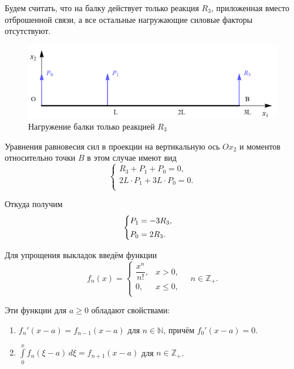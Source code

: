 \documentclass[12pt, a4paper]{article}
\begin{document}
	Будем считать, что на балку действует только реакция $R_3$, приложенная вместо отброшенной связи, а все остальные нагружающие силовые факторы отсутствуют.
	
	\begin{figure}[!h]
		\centering
		\includegraphics[width=0.75\linewidth]{plot-4}
		\caption{Нагружение балки только реакцией $R_3$}
	\end{figure}
	
	Уравнения равновесия сил в проекции на вертикальную ось $Ox_2$ и моментов относительно точки $B$ в этом случае имеют вид
	\vspace{-0.5em}
	\begin{equation*}
		\begin{cases}
			R_3 + P_1 + P_0 = 0, \\ 
			2L \cdot P_1 + 3L \cdot P_0 = 0. \\
		\end{cases}
	\end{equation*}
	
	Откуда получим
	\begin{equation}
		\begin{cases} \vspace{0.25em}
			P_1 = - 3 R_3, \\ 
			P_0 = 2 R_3. \\
		\end{cases}
		\label{eqP0P1R}
	\end{equation}
	
	Для упрощения выкладок введём функции
	\[
	f_n(x) = 
	\begin{cases}
		\dfrac{x^n}{n!}, & x > 0, \\ 
		0, & x \leq 0, \\
	\end{cases}
	\quad n \in \mathbb{Z}_+.
	\]
	
	\newpage
	
	Эти функции для $a \geq 0$ обладают свойствами:
	\begin{enumerate}
		\item $f_n'(x - a) = f_{n-1}(x - a)$ для $n \in \mathbb{N}$, причём $f_0'(x - a) = 0$.
		
		\vspace{0.25em}
		
		\item $\int\limits_0^{x} f_n(\xi - a) \, d \xi = f_{n+1}(x - a)$ для $n \in \mathbb{Z}_+$.
	\end{enumerate}
	
\end{document}
